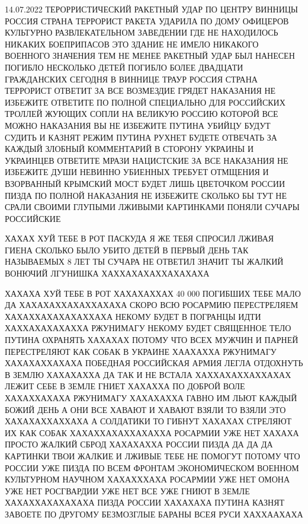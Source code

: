 14.07.2022
ТЕРОРРИСТИЧЕСКИЙ РАКЕТНЫЙ УДАР ПО ЦЕНТРУ ВИННИЦЫ РОССИЯ СТРАНА ТЕРРОРИСТ РАКЕТА
УДАРИЛА ПО ДОМУ ОФИЦЕРОВ КУЛЬТУРНО РАЗВЛЕКАТЕЛЬНОМ ЗАВЕДЕНИИ ГДЕ НЕ НАХОДИЛОСЬ
НИКАКИХ БОЕПРИПАСОВ ЭТО ЗДАНИЕ НЕ ИМЕЛО НИКАКОГО ВОЕННОГО ЗНАЧЕНИЯ ТЕМ НЕ МЕНЕЕ
РАКЕТНЫЙ УДАР БЫЛ НАНЕСЕН ПОГИБЛО НЕСКОЛЬКО ДЕТЕЙ ПОГИБЛО БОЛЕЕ ДВАДЦАТИ
ГРАЖДАНСКИХ СЕГОДНЯ В ВИННИЦЕ ТРАУР РОССИЯ СТРАНА ТЕРРОРИСТ ОТВЕТИТ ЗА ВСЕ
ВОЗМЕЗДИЕ ГРЯДЕТ НАКАЗАНИЯ НЕ ИЗБЕЖИТЕ ОТВЕТИТЕ ПО ПОЛНОЙ СПЕЦИАЛЬНО ДЛЯ
РОССИЙСКИХ ТРОЛЛЕЙ ЖУЮЩИХ СОПЛИ НА ВЕЛИКУЮ РОССИЮ КОТОРОЙ ВСЕ МОЖНО НАКАЗАНИЯ
ВЫ НЕ ИЗБЕЖИТЕ ПУТИНА УБИЙЦУ БУДУТ СУДИТЬ И КАЗНЯТ РЕЖИМ ПУТИНА РУХНЕТ БУДЕТЕ
ОТВЕЧАТЬ ЗА КАЖДЫЙ ЗЛОБНЫЙ КОММЕНТАРИЙ В СТОРОНУ УКРАИНЫ И УКРАИНЦЕВ ОТВЕТИТЕ
МРАЗИ НАЦИСТСКИЕ ЗА ВСЕ НАКАЗАНИЯ НЕ ИЗБЕЖИТЕ ДУШИ НЕВИННО УБИЕННЫХ ТРЕБУЕТ
ОТМЩЕНИЯ И ВЗОРВАННЫЙ КРЫМСКИЙ МОСТ БУДЕТ ЛИШЬ ЦВЕТОЧКОМ РОССИИ ПИЗДА ПО ПОЛНОЙ
НАКАЗАНИЯ НЕ ИЗБЕЖИТЕ СКОЛЬКО БЫ ТУТ НЕ СРАЛИ СВОИМИ ГЛУПЫМИ ЛЖИВЫМИ КАРТИНКАМИ
ПОНЯЛИ СУЧАРЫ РОССИЙСКИЕ

ХАХАХ ХУЙ ТЕБЕ В РОТ ПАСКУДА Я ЖЕ ТЕБЯ СПРОСИЛ ЛЖИВАЯ ГИЕНА СКОЛЬКО БЫЛО УБИТО
ДЕТЕЙ В ПЕРВЫЙ ДЕНЬ ТАК НАЗЫВАЕМЫХ 8 ЛЕТ ТЫ СУЧАРА НЕ ОТВЕТИЛ ЗНАЧИТ ТЫ ЖАЛКИЙ
ВОНЮЧИЙ ЛГУНИШКА ХАХХАХАХАХХАХАХАХА

ХАХАХА ХУЙ ТЕБЕ В РОТ ХАХАХАХХАХ 40 000 ПОГИБШИХ ТЕБЕ МАЛО ДА
ХАХАХАХХАХАХХАХАХА СКОРО ВСЮ РОСАРМИЮ ПЕРЕСТРЕЛЯЕМ ХАХАХХАХАХАХАХХАХА НЕКОМУ
БУДЕТ В ПОГРАНЦЫ ИДТИ ХАХХАХАХАХАХХА РЖУНИМАГУ НЕКОМУ БУДЕТ СВЯЩЕННОЕ ТЕЛО ПУТИНА 
ОХРАНЯТЬ ХАХАХАХ ПОТОМУ ЧТО ВСЕХ МУЖЧИН И ПАРНЕЙ ПЕРЕСТРЕЛЯЮТ КАК СОБАК В УКРАИНЕ
ХААХАХХА РЖУНИМАГУ ХАХАХАХХАХАХА ПОБЕДНАЯ РОССИЙСКАЯ АРМИЯ ЛЕГЛА ОТДОХНУТЬ В ЗЕМЛЮ
ХАХАХАХХА ДА ТАК И НЕ ВСТАЛА ХАХХАХАХХАХХАХАХ ЛЕЖИТ СЕБЕ В ЗЕМЛЕ ГНИЕТ ХАХАХХА
ПО ДОБРОЙ ВОЛЕ ХАХАХХАХАХА РЖУНИМАГУ ХАХАХАХХА ГАВНО ИМ ЛЬЮТ КАЖДЫЙ БОЖИЙ ДЕНЬ
А ОНИ ВСЕ ХАВАЮТ И ХАВАЮТ ВЗЯЛИ ТО ВЗЯЛИ ЭТО ХАХАХАХХАХХАХА А СОЛДАТИКИ ТО ГИБНУТ ХАХАХАХ
СТРЕЛЯЮТ ИХ КАК СОБАК ХАХАХХАХАХХАХАХХА РОСАРМИИ УЖЕ НЕТ ХАХАХА ПРОСТО ЖАЛКИЙ СБРОД ХАХАХАХХА
РОССИИ ПИЗДА ДА ДА ДА КАРТИНКИ ТВОИ ЖАЛКИЕ И ЛЖИВЫЕ ТЕБЕ НЕ ПОМОГУТ ПОТОМУ ЧТО 
РОССИИ УЖЕ ПИЗДА ПО ВСЕМ ФРОНТАМ ЭКОНОМИЧЕСКОМ ВОЕННОМ КУЛЬТУРНОМ НАУЧНОМ ХАХАХХХАХА
РОСАРМИИ УЖЕ НЕТ ОМОНА УЖЕ НЕТ РОСГВАРДИИ УЖЕ НЕТ ВСЕ УЖЕ ГНИЮТ В ЗЕМЛЕ ХАХАХХАХАХАХАХА
ПИЗДА РОССИИ ХАХАХАХА ПУТИНА КАЗНЯТ ЗАВОЕТЕ ПО ДРУГОМУ БЕЗМОЗГЛЫЕ БАРАНЫ ВСЕЯ РУСИ ХАХХААХАХА

